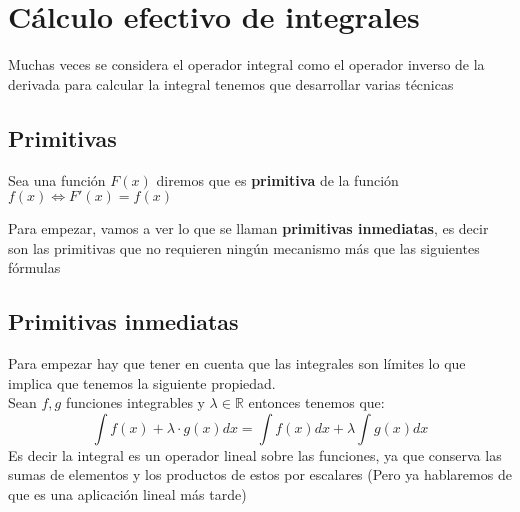 \section{Cálculo efectivo de integrales}
\noindent
Muchas veces se considera el operador integral como el operador inverso de la derivada para calcular la integral tenemos que desarrollar varias técnicas 
\subsection*{Primitivas}
\begin{defi}
Sea una función $F(x)$ diremos que es \textbf{primitiva} de la función $f(x)\Leftrightarrow F'(x)=f(x)$
\end{defi}
\noindent
Para empezar, vamos a ver lo que se llaman \textbf{primitivas inmediatas}, es decir son las primitivas que no requieren ningún mecanismo más que las siguientes fórmulas

\subsection{Primitivas inmediatas}
Para empezar hay que tener en cuenta que las integrales son límites lo que implica que tenemos la siguiente propiedad.\\

Sean $f,g$ funciones integrables y $\lambda \in \mathbb{R}$ entonces tenemos que:
$$
\int f(x)+\lambda\cdot g(x )dx=\int f(x) dx+\lambda\int g(x) dx
$$
\noindent
Es decir la integral es un operador lineal sobre las funciones, ya que conserva las sumas de elementos y los productos de estos por escalares (Pero ya hablaremos de que es una aplicación lineal más tarde)


